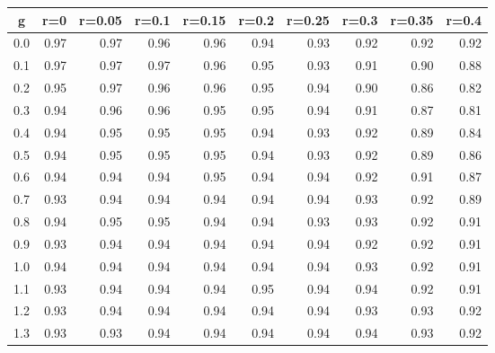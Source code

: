 %
\begin{table}[!tbp]
 \begin{center}
 \begin{tabular}{rrrrrrrrrr}\hline\hline
\multicolumn{1}{c}{g}&\multicolumn{1}{c}{r=0}&\multicolumn{1}{c}{r=0.05}&\multicolumn{1}{c}{r=0.1}&\multicolumn{1}{c}{r=0.15}&\multicolumn{1}{c}{r=0.2}&\multicolumn{1}{c}{r=0.25}&\multicolumn{1}{c}{r=0.3}&\multicolumn{1}{c}{r=0.35}&\multicolumn{1}{c}{r=0.4}\tabularnewline
\hline
0.0&0.97&0.97&0.96&0.96&0.94&0.93&0.92&0.92&0.92\tabularnewline
0.1&0.97&0.97&0.97&0.96&0.95&0.93&0.91&0.90&0.88\tabularnewline
0.2&0.95&0.97&0.96&0.96&0.95&0.94&0.90&0.86&0.82\tabularnewline
0.3&0.94&0.96&0.96&0.95&0.95&0.94&0.91&0.87&0.81\tabularnewline
0.4&0.94&0.95&0.95&0.95&0.94&0.93&0.92&0.89&0.84\tabularnewline
0.5&0.94&0.95&0.95&0.95&0.94&0.93&0.92&0.89&0.86\tabularnewline
0.6&0.94&0.94&0.94&0.95&0.94&0.94&0.92&0.91&0.87\tabularnewline
0.7&0.93&0.94&0.94&0.94&0.94&0.94&0.93&0.92&0.89\tabularnewline
0.8&0.94&0.95&0.95&0.94&0.94&0.93&0.93&0.92&0.91\tabularnewline
0.9&0.93&0.94&0.94&0.94&0.94&0.94&0.92&0.92&0.91\tabularnewline
1.0&0.94&0.94&0.94&0.94&0.94&0.94&0.93&0.92&0.91\tabularnewline
1.1&0.93&0.94&0.94&0.94&0.95&0.94&0.94&0.92&0.91\tabularnewline
1.2&0.93&0.94&0.94&0.94&0.94&0.94&0.93&0.93&0.92\tabularnewline
1.3&0.93&0.93&0.94&0.94&0.94&0.94&0.94&0.93&0.92\tabularnewline
\hline
\end{tabular}

\end{center}

\end{table}

